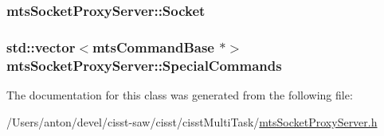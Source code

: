 \subsubsection[{Socket}]{ mts\+Socket\+Proxy\+Server\+::\+Socket\hspace{0.3cm}{\ttfamily [protected]}}\label{classmts_socket_proxy_server_a8d1606419800ffe082caf5a6805dde19}
\hypertarget{classmts_socket_proxy_server_a033ddf4256700a5393055451d6f883a0}{}
\subsubsection[{Special\+Commands}]{\setlength{\rightskip}{0pt plus 5cm}std\+::vector$<${\bf mts\+Command\+Base} $\ast$$>$ mts\+Socket\+Proxy\+Server\+::\+Special\+Commands\hspace{0.3cm}{\ttfamily [protected]}}\label{classmts_socket_proxy_server_a033ddf4256700a5393055451d6f883a0}


The documentation for this class was generated from the following file\+:\begin{DoxyCompactItemize}
\item 
/\+Users/anton/devel/cisst-\/saw/cisst/cisst\+Multi\+Task/\hyperlink{mts_socket_proxy_server_8h}{mts\+Socket\+Proxy\+Server.\+h}\end{DoxyCompactItemize}
